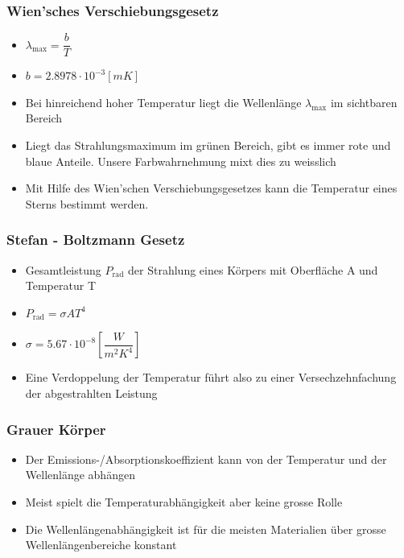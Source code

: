 \documentclass[8pt,a4paper]{scrartcl}
\begin{document}
\begin{multicols*}{3}
\begin{itemize}
							\end{itemize}	
					
						\subsubsection{Wien’sches Verschiebungsgesetz}
							\begin{itemize}\itemsep0pt
								\item $\lambda_{\text{max}}=\dfrac{b}{T}$
								\item $b = 2.8978 \cdot 10^{-3} [mK]$
								\item Bei hinreichend hoher Temperatur liegt die Wellenlänge $\lambda_{\text{max}}$ im sichtbaren Bereich
								\item Liegt das Strahlungsmaximum im grünen Bereich, gibt es immer rote und blaue Anteile. Unsere Farbwahrnehmung mixt dies zu weisslich
								\item Mit Hilfe des Wien’schen Verschiebungsgesetzes kann die Temperatur eines Sterns bestimmt werden.
							\end{itemize}	
						
						\subsubsection{Stefan - Boltzmann Gesetz}
							\begin{itemize}\itemsep0pt
								\item Gesamtleistung $P_{\text{rad}}$ der Strahlung eines Körpers mit Oberfläche A und Temperatur T
								\item $P_{\text{rad}} = \sigma AT^{4}$
								\item $\sigma = 5.67\cdot 10^{-8} [\dfrac{W}{m^{2}K^{4}}]$
								\item Eine Verdoppelung der Temperatur führt also zu einer Versechzehnfachung der abgestrahlten Leistung
							\end{itemize}	

						\subsubsection{Grauer Körper}
							\begin{itemize}\itemsep0pt
								
								\item Der Emissions-/Absorptionskoeffizient kann von der Temperatur und der Wellenlänge abhängen
								\item Meist spielt die Temperaturabhängigkeit aber keine grosse Rolle
								\item Die Wellenlängenabhängigkeit ist für die meisten Materialien über grosse Wellenlängenbereiche konstant	
							\end{itemize}	



\end{multicols*}

\end{document}
